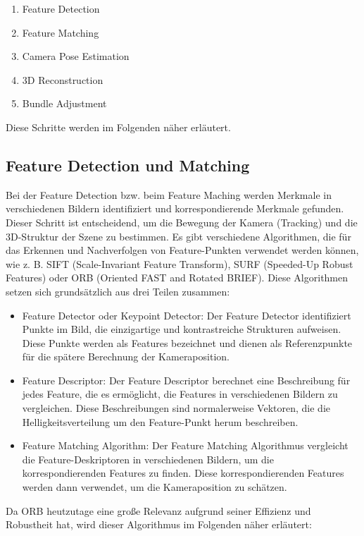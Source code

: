 \begin{enumerate}
    \item Feature Detection
    \item Feature Matching
    \item Camera Pose Estimation
    \item 3D Reconstruction
    \item Bundle Adjustment
\end{enumerate}

Diese Schritte werden im Folgenden näher erläutert.

\subsection{Feature Detection und Matching}

Bei der Feature Detection bzw. beim Feature Maching werden Merkmale in verschiedenen Bildern identifiziert und korrespondierende Merkmale gefunden. Dieser Schritt ist entscheidend, um die Bewegung der Kamera (Tracking) und die 3D-Struktur der Szene zu bestimmen. Es gibt verschiedene Algorithmen, die für das Erkennen und Nachverfolgen von Feature-Punkten verwendet werden können, wie z. B. SIFT (Scale-Invariant Feature Transform), SURF (Speeded-Up Robust Features) oder ORB (Oriented FAST and Rotated BRIEF). Diese Algorithmen setzen sich grundsätzlich aus drei Teilen zusammen:

\begin{itemize}
    \item Feature Detector oder Keypoint Detector: Der Feature Detector identifiziert Punkte im Bild, die einzigartige und kontrastreiche Strukturen aufweisen. Diese Punkte werden als Features bezeichnet und dienen als Referenzpunkte für die spätere Berechnung der Kameraposition.
    \item Feature Descriptor: Der Feature Descriptor berechnet eine Beschreibung für jedes Feature, die es ermöglicht, die Features in verschiedenen Bildern zu vergleichen. Diese Beschreibungen sind normalerweise Vektoren, die die Helligkeitsverteilung um den Feature-Punkt herum beschreiben.
    \item Feature Matching Algorithm: Der Feature Matching Algorithmus vergleicht die Feature-Deskriptoren in verschiedenen Bildern, um die korrespondierenden Features zu finden. Diese korrespondierenden Features werden dann verwendet, um die Kameraposition zu schätzen.  
\end{itemize}


Da ORB heutzutage eine große Relevanz aufgrund seiner Effizienz und Robustheit hat, wird dieser Algorithmus im Folgenden näher erläutert:

